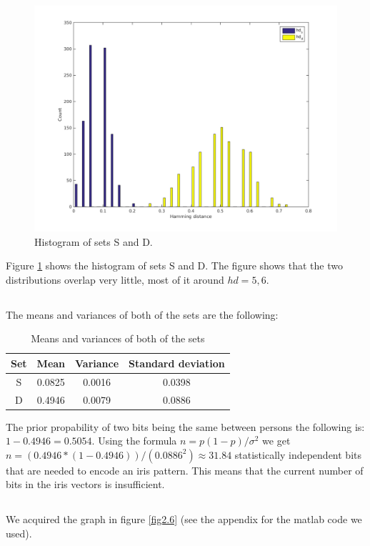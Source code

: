 \documentclass{article}
\begin{document}
\subsection{}
\begin{figure}[H]
	\centering
	\includegraphics[width=.7\linewidth]{plot2_4.png}
	\caption{Histogram of sets S and D.}
	\label{fig2.4}
\end{figure}
Figure \ref{fig2.4} shows the histogram of sets S and D. The figure shows that the two distributions overlap very little, most of it around $hd = 5,6$.

\subsection{}
The means and variances of both of the sets are the following:
\begin{table}[H]
 \begin{tabular}{|c|c|c|c|}
  \hline
  Set & Mean & Variance & Standard deviation \\
  \hline
  S & 0.0825 & 0.0016 & 0.0398 \\
  \hline
  D & 0.4946 & 0.0079 & 0.0886 \\
  \hline
 \end{tabular}
 \caption{Means and variances of both of the sets}
 \label{tab2.5}
\end{table}
\noindent The prior propability of two bits being the same between persons the following is: $1-0.4946=0.5054$.
Using the formula $n=p(1-p)/\sigma^2$ we get $n=(0.4946*(1-0.4946))/(0.0886^2)\approx 31.84$ statistically independent bits that are needed to encode an iris pattern. This means that the current number of bits in the iris vectors is insufficient.

\subsection{}
We acquired the graph in figure \ref{fig2.6} (see the appendix for the matlab code we used).
\end{document}

